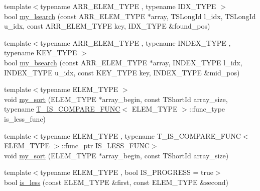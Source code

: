 \begin{DoxyCompactItemize}
\item 
{\footnotesize template$<$typename A\+R\+R\+\_\+\+E\+L\+E\+M\+\_\+\+T\+Y\+P\+E , typename I\+D\+X\+\_\+\+T\+Y\+P\+E $>$ }\\bool \hyperlink{namespaceuva_1_1smt_1_1utils_1_1array_a8521db16ea82bce46a07bbdb3708a5a9}{my\+\_\+lsearch} (const A\+R\+R\+\_\+\+E\+L\+E\+M\+\_\+\+T\+Y\+P\+E $\ast$array, T\+S\+Long\+Id l\+\_\+idx, T\+S\+Long\+Id u\+\_\+idx, const A\+R\+R\+\_\+\+E\+L\+E\+M\+\_\+\+T\+Y\+P\+E key, I\+D\+X\+\_\+\+T\+Y\+P\+E \&found\+\_\+pos)
\item 
{\footnotesize template$<$typename A\+R\+R\+\_\+\+E\+L\+E\+M\+\_\+\+T\+Y\+P\+E , typename I\+N\+D\+E\+X\+\_\+\+T\+Y\+P\+E , typename K\+E\+Y\+\_\+\+T\+Y\+P\+E $>$ }\\bool \hyperlink{namespaceuva_1_1smt_1_1utils_1_1array_af6085b8042d506eda2b2591614b43746}{my\+\_\+bsearch} (const A\+R\+R\+\_\+\+E\+L\+E\+M\+\_\+\+T\+Y\+P\+E $\ast$array, I\+N\+D\+E\+X\+\_\+\+T\+Y\+P\+E l\+\_\+idx, I\+N\+D\+E\+X\+\_\+\+T\+Y\+P\+E u\+\_\+idx, const K\+E\+Y\+\_\+\+T\+Y\+P\+E key, I\+N\+D\+E\+X\+\_\+\+T\+Y\+P\+E \&mid\+\_\+pos)
\item 
{\footnotesize template$<$typename E\+L\+E\+M\+\_\+\+T\+Y\+P\+E $>$ }\\void \hyperlink{namespaceuva_1_1smt_1_1utils_1_1array_a0134027046c3e661f065c4366fc0e7d1}{my\+\_\+sort} (E\+L\+E\+M\+\_\+\+T\+Y\+P\+E $\ast$array\+\_\+begin, const T\+Short\+Id array\+\_\+size, typename \hyperlink{structuva_1_1smt_1_1utils_1_1array_1_1_t___i_s___c_o_m_p_a_r_e___f_u_n_c}{T\+\_\+\+I\+S\+\_\+\+C\+O\+M\+P\+A\+R\+E\+\_\+\+F\+U\+N\+C}$<$ E\+L\+E\+M\+\_\+\+T\+Y\+P\+E $>$\+::func\+\_\+type is\+\_\+less\+\_\+func)
\item 
{\footnotesize template$<$typename E\+L\+E\+M\+\_\+\+T\+Y\+P\+E , typename T\+\_\+\+I\+S\+\_\+\+C\+O\+M\+P\+A\+R\+E\+\_\+\+F\+U\+N\+C$<$ E\+L\+E\+M\+\_\+\+T\+Y\+P\+E $>$\+::func\+\_\+ptr I\+S\+\_\+\+L\+E\+S\+S\+\_\+\+F\+U\+N\+C$>$ }\\void \hyperlink{namespaceuva_1_1smt_1_1utils_1_1array_ae4bb9605bac91686c73ea21648799154}{my\+\_\+sort} (E\+L\+E\+M\+\_\+\+T\+Y\+P\+E $\ast$array\+\_\+begin, const T\+Short\+Id array\+\_\+size)
\item 
{\footnotesize template$<$typename E\+L\+E\+M\+\_\+\+T\+Y\+P\+E , bool I\+S\+\_\+\+P\+R\+O\+G\+R\+E\+S\+S = true$>$ }\\bool \hyperlink{namespaceuva_1_1smt_1_1utils_1_1array_ad3369b36af8318c28e9dabc5bfae99f9}{is\+\_\+less} (const E\+L\+E\+M\+\_\+\+T\+Y\+P\+E \&first, const E\+L\+E\+M\+\_\+\+T\+Y\+P\+E \&second)
\end{DoxyCompactItemize}


